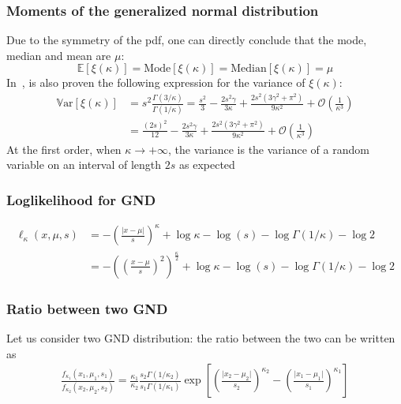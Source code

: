 \documentclass[a4paper,11pt]{article}
\newcommand{\Var}{\mathbb{V}\text{ar}}
\newcommand{\Ex}{\mathbb{E}}
\theoremstyle{defi}
\numberwithin{thmCounter}{section}
\begin{document}
\subsubsection{Moments of the generalized normal distribution}
\label{sec:generalized_normal_distribution_moments}
Due to the symmetry of the pdf, one can directly conclude that the mode, median and mean are $\mu$:
\begin{equation}
  \Ex[\xi(\kappa)] = \mathrm{Mode}[\xi(\kappa)] = \mathrm{Median}[\xi(\kappa)] = \mu 
\end{equation}
In~\cite{pogany_characteristic_2010}, is also proven the following expression for the variance of $\xi(\kappa)$:
\begin{align}
  \Var\left[\xi(\kappa)\right] &= s^2 \frac{\Gamma(3 / \kappa)}{\Gamma(1/ \kappa)} = \frac{s^2}{3} - \frac{2s^2 \gamma}{3\kappa} + \frac{2s^2(3\gamma^2 +\pi^2)}{9\kappa^2} + \mathcal{O}\left(\frac{1}{\kappa^3}\right) \\
                               &= \frac{(2s)^2}{12} - \frac{2s^2 \gamma}{3\kappa} + \frac{2s^2(3\gamma^2 +\pi^2)}{9\kappa^2} + \mathcal{O}\left(\frac{1}{\kappa^3}\right)
\end{align}
At the first order, when $\kappa\rightarrow +\infty$, the variance is the variance of a random variable on an interval of length $2s$ as expected

\subsubsection{Loglikelihood for GND}
\label{sec:loglik_GND}

\begin{align}
  \ell_{\kappa}(x, \mu, s) &= -\left(\frac{\lvert x-\mu \rvert}{s}\right)^\kappa + \log \kappa - \log(s) - \log \Gamma(1/\kappa) - \log 2 \\
  &= -\left(\left(\frac{x-\mu}{s}\right)^2\right)^{\frac{\kappa}{2}} + \log \kappa - \log(s) - \log \Gamma(1/\kappa) - \log 2
  \end{align}
\subsubsection{Ratio between two GND}
\label{sec:ratio_GND}
Let us consider two GND distribution: the ratio between the two can be written as
\begin{align}
  \frac{f_{\kappa_1}(x_1, \mu_1, s_1)}{f_{\kappa_2}(x_2, \mu_2, s_2)} = \frac{\kappa_1}{\kappa_2} \frac{s_2 \Gamma(1/ \kappa_2)}{s_1 \Gamma(1/ \kappa_1)} \exp \left[\left(\frac{\lvert x_2 - \mu_2 \rvert}{s_2}\right)^{\kappa_2}-\left(\frac{\lvert x_1 - \mu_1 \rvert}{s_1}\right)^{\kappa_1} \right]
\end{align}
\end{document}
